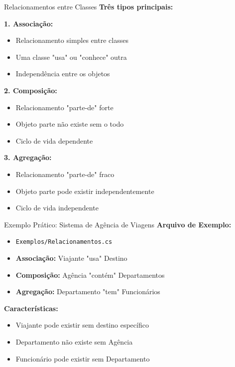 \documentclass[aspectratio=169]{beamer}
\begin{document}
\begin{frame}{Relacionamentos entre Classes}
\textbf{Três tipos principais:}

\textbf{1. Associação:}
\begin{itemize}
    \item Relacionamento simples entre classes
    \item Uma classe "usa" ou "conhece" outra
    \item Independência entre os objetos
\end{itemize}

\textbf{2. Composição:}
\begin{itemize}
    \item Relacionamento "parte-de" forte
    \item Objeto parte não existe sem o todo
    \item Ciclo de vida dependente
\end{itemize}

\textbf{3. Agregação:}
\begin{itemize}
    \item Relacionamento "parte-de" fraco
    \item Objeto parte pode existir independentemente
    \item Ciclo de vida independente
\end{itemize}
\end{frame}

\begin{frame}{Exemplo Prático: Sistema de Agência de Viagens}
\textbf{Arquivo de Exemplo:}
\begin{itemize}
    \item \texttt{Exemplos/Relacionamentos.cs}
    \item \textbf{Associação:} Viajante "usa" Destino
    \item \textbf{Composição:} Agência "contém" Departamentos
    \item \textbf{Agregação:} Departamento "tem" Funcionários
\end{itemize}

\textbf{Características:}
\begin{itemize}
    \item Viajante pode existir sem destino específico
    \item Departamento não existe sem Agência
    \item Funcionário pode existir sem Departamento
\end{itemize}
\end{frame}
\end{document}
